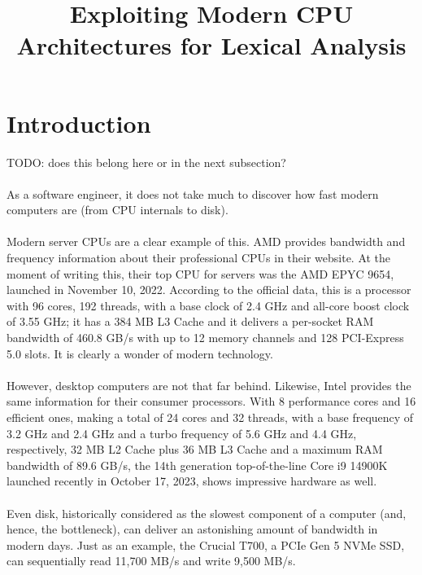 \documentclass[12pt]{article}
\title{\vspace{-2.5cm}\textbf{Exploiting Modern CPU Architectures for Lexical Analysis}}
\date{\vspace{-5ex}}
\begin{document}
	\maketitle{\vspace{-1.5cm}}
	\newpage
	\tableofcontents
	\newpage
	\section{Introduction}
	TODO: does this belong here or in the next subsection?
	
	\paragraph{}As a software engineer, it does not take much to discover how fast modern computers are (from CPU internals to disk).
	
	\paragraph{}Modern server CPUs are a clear example of this. AMD provides bandwidth and frequency information about their professional CPUs in their website. At the moment of writing this, their top CPU for servers was the AMD EPYC 9654\cite{epyc}, launched in November 10, 2022. According to the official data, this is a processor with 96 cores, 192 threads, with a base clock of 2.4 GHz and all-core boost clock of 3.55 GHz; it has a 384 MB L3 Cache and it delivers a per-socket RAM bandwidth of 460.8 GB/s with up to 12 memory channels and 128 PCI-Express 5.0 slots. It is clearly a wonder of modern technology.
	
	\paragraph{}However, desktop computers are not that far behind. Likewise, Intel provides the same information for their consumer processors. With 8 performance cores and 16 efficient ones, making a total of 24 cores and 32 threads, with a base frequency of 3.2 GHz and 2.4 GHz and a turbo frequency of 5.6 GHz and 4.4 GHz, respectively, 32 MB L2 Cache plus 36 MB L3 Cache and a maximum RAM bandwidth of 89.6 GB/s, the 14th generation top-of-the-line Core i9 14900K launched recently in October 17, 2023\cite{13900k}, shows impressive hardware as well.
	
	\paragraph{}Even disk, historically considered as the slowest component of a computer (and, hence, the bottleneck), can deliver an astonishing amount of bandwidth in modern days. Just as an example, the Crucial T700, a PCIe Gen 5 NVMe SSD, can sequentially read 11,700 MB/s and write 9,500 MB/s\cite{crucialt700}.
	
\end{document}

